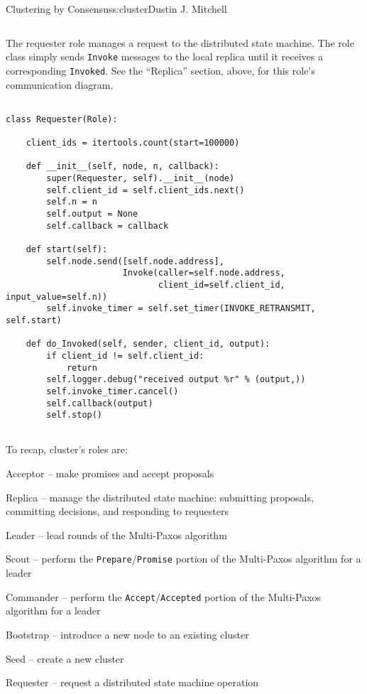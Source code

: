 \begin{aosachapter}{Clustering by Consensus}{s:cluster}{Dustin J. Mitchell}
\begin{verbatim}
\end{verbatim}

\label{requester}

The requester role manages a request to the distributed state machine.
The role class simply sends \texttt{Invoke} messages to the local
replica until it receives a corresponding \texttt{Invoked}. See the
``Replica'' section, above, for this role's communication diagram.

\begin{verbatim}

class Requester(Role):

    client_ids = itertools.count(start=100000)

    def __init__(self, node, n, callback):
        super(Requester, self).__init__(node)
        self.client_id = self.client_ids.next()
        self.n = n
        self.output = None
        self.callback = callback

    def start(self):
        self.node.send([self.node.address], 
                       Invoke(caller=self.node.address, 
                              client_id=self.client_id, input_value=self.n))
        self.invoke_timer = self.set_timer(INVOKE_RETRANSMIT, self.start)

    def do_Invoked(self, sender, client_id, output):
        if client_id != self.client_id:
            return
        self.logger.debug("received output %r" % (output,))
        self.invoke_timer.cancel()
        self.callback(output)
        self.stop()
    
\end{verbatim}

\label{summary}

To recap, cluster's roles are:

\begin{aosaitemize}

\item
  Acceptor -- make promises and accept proposals
\item
  Replica -- manage the distributed state machine: submitting proposals,
  committing decisions, and responding to requesters
\item
  Leader -- lead rounds of the Multi-Paxos algorithm
\item
  Scout -- perform the \texttt{Prepare}/\texttt{Promise} portion of the
  Multi-Paxos algorithm for a leader
\item
  Commander -- perform the \texttt{Accept}/\texttt{Accepted} portion of
  the Multi-Paxos algorithm for a leader
\item
  Bootstrap -- introduce a new node to an existing cluster
\item
  Seed -- create a new cluster
\item
  Requester -- request a distributed state machine operation
\end{aosaitemize}


\end{aosachapter}
